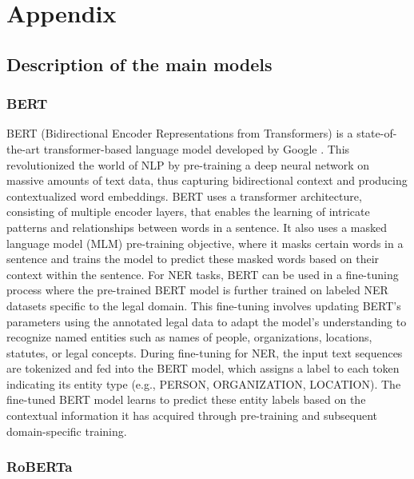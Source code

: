 \documentclass{article}
\begin{document}
\newpage
\printbibliography



\newpage
\section{Appendix}

\subsection{Description of the main models}
\subsubsection{BERT}

BERT (Bidirectional Encoder Representations from Transformers) is a state-of-the-art transformer-based language model developed by Google \cite{BERT}. This revolutionized the world of NLP by pre-training a deep neural network on massive amounts of text data, thus capturing bidirectional context and producing contextualized word embeddings. BERT uses a transformer architecture, consisting of multiple encoder layers, that enables the learning of intricate patterns and relationships between words in a sentence. It also uses a masked language model (MLM) pre-training objective, where it masks certain words in a sentence and trains the model to predict these masked words based on their context within the sentence. For NER tasks, BERT can be used in a fine-tuning process where the pre-trained BERT model is further trained on labeled NER datasets specific to the legal domain. This fine-tuning involves updating BERT's parameters using the annotated legal data to adapt the model's understanding to recognize named entities such as names of people, organizations, locations, statutes, or legal concepts. During fine-tuning for NER, the input text sequences are tokenized and fed into the BERT model, which assigns a label to each token indicating its entity type (e.g., PERSON, ORGANIZATION, LOCATION). The fine-tuned BERT model learns to predict these entity labels based on the contextual information it has acquired through pre-training and subsequent domain-specific training.

\subsubsection{RoBERTa}
\end{document}
